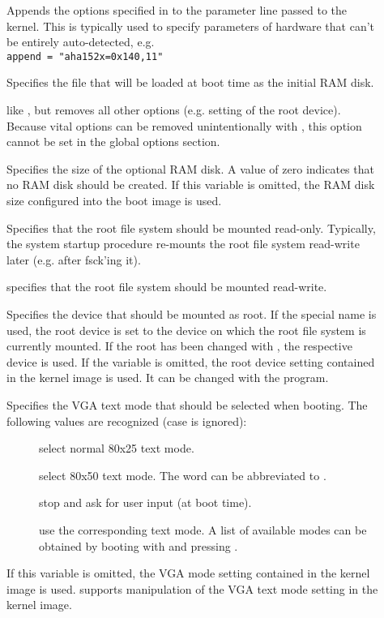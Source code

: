 \begin{description}
  \item[] Appends the options specified in
    {} to the parameter line passed to the kernel. This is
    typically used to specify parameters of hardware that can't be entirely
    auto-detected, e.g.\\
    \verb'append = "aha152x=0x140,11"'
  \item[] Specifies the file that will be loaded at
    boot time as the initial RAM disk. 
  \item[] like , but removes all other
    options (e.g. setting of the root device). Because vital options can be
    removed unintentionally with , this option cannot be set in
    the global options section.
  \item[] Specifies the size of the optional RAM disk.
    A value of zero indicates that no RAM disk should be created. If this
    variable is omitted, the RAM disk size configured into the boot
    image is used.
  \item[] Specifies that the root file system should be
    mounted read-only. Typically, the system startup procedure re-mounts
    the root file system read-write later (e.g. after fsck'ing it).
  \item[] specifies that the root file system should be
    mounted read-write.
  \item[] Specifies the device that should be
    mounted as root. If the special name  is used, the root
    device is set to the device on which the root file system is currently
    mounted. If the root has been changed with , the respective
    device is used. If the variable  is omitted, the root device
    setting contained in the kernel image is used. It can be changed
    with the  program.
  \item[]\label{vga} Specifies the VGA text mode that
    should be selected when booting. The following values are recognized
    (case is ignored):
    \begin{description}
      \item[] select normal 80x25 text mode.
      \item[] select 80x50 text mode. The word 
	can be abbreviated to .
      \item[] stop and ask for user input (at boot time).
      \item[] use the corresponding text mode. A list of available
	modes can be obtained by booting with  and pressing
	.
    \end{description}
    If this variable is omitted, the VGA mode setting contained in the kernel
    image is used.  supports manipulation of the VGA text mode
    setting in the kernel image.
\end{description}


